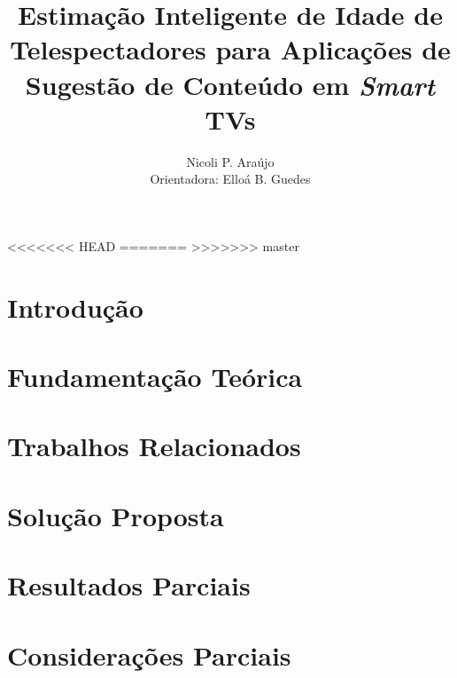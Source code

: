 \documentclass[12pt]{article}
\title{Estimação Inteligente de Idade de Telespectadores para Aplicações de Sugestão de Conteúdo em \emph{Smart} TVs}
\author{Nicoli P. Araújo\\
Orientadora: Elloá B. Guedes}
\begin{document}

\maketitle

<<<<<<< HEAD
=======
>>>>>>> master

\section{Introdução}\label{sec:intro}


\section{Fundamentação Teórica}\label{sec:fund_teorica}


\section{Trabalhos Relacionados}\label{sec:trab_relac}


\section{Solução Proposta}\label{sec:solucao_proposta}


\section{Resultados Parciais}
\label{sec:resultados}

\section{Considerações Parciais}\label{sec:consid_finais}




\end{document}
